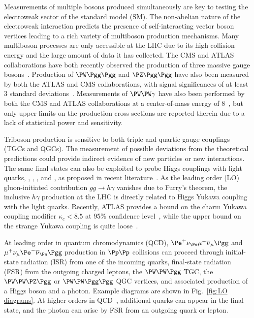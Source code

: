 \maketitle 

Measurements of multiple bosons produced simultaneously are key to testing the electroweak sector of the standard model (SM). The non-abelian nature of the electroweak interaction predicts the presence of self-interacting vector boson vertices leading to a rich variety of multiboson production mechanisms. Many multiboson processes are only accessible at the LHC due to its high collision energy and the large amount of data it has collected. The CMS and ATLAS collaborations have both recently observed the production of three massive gauge bosons~\cite{CMS:2020hjs,ATLAS:2021atz}.  Production of $\PW\Pgg\Pgg$ and $\PZ\Pgg\Pgg$ have also been measured by both the ATLAS and CMS collaborations, with signal significances of at least 3 standard deviations~\cite{ATLAS:2015ify,ATLAS:2016qjc,CMS:2017tzy,CMS:2021jji}. Measurements of $\PW\PW\gamma$ have also been performed by both the CMS and ATLAS collaborations at a center-of-mass energy of 8\TeV~\cite{CMS:2014cdf,ATLAS:2017bon}, but only upper limits on the production cross sections are reported therein due to a lack of statistical power and sensitivity.

Triboson production is sensitive to both triple and quartic gauge couplings (TGCs and QGCs). The measurement of possible deviations from the theoretical predictions could provide indirect evidence of new particles or new interactions. The same final states can also be exploited to probe Higgs couplings with light quarks, \PQc, \PQs, \PQu, and \PQd, as proposed in recent literature~\cite{Khanpour:2017inb,Aguilar-Saavedra:2020rgo,Falkowski:2020znk}. As the leading order (LO) gluon-initiated contribution $gg\rightarrow h\gamma$ vanishes due to Furry’s theorem, the inclusive $h\gamma$ production at the LHC is directly related to Higgs Yukawa coupling with the light quarks. Recently, ATLAS provides a bound on the charm Yukawa coupling modifier $\kappa_c<8.5$ at 95\% confidence level~\cite{ATLAS:2021zwx}, while the upper bound on the strange Yukawa coupling is quite loose~\cite{Duarte-Campderros:2018ouv,ATLAS:2018xfc}.

At leading order in quantum chromodynamics (QCD), $\Pe^+\nu_{\Pe}\mu^-\overline{\nu}_{\mu}\Pgg$ and $\mu^+\nu_{\mu}\Pe^-\overline{\nu}_{\Pe}\Pgg$ production in $\Pp\Pp$ collisions can proceed through initial-state radiation (ISR) from one of the incoming quarks, final-state radiation (FSR) from the outgoing charged leptons, the $\PW\PW\Pgg$ TGC, the $\PW\PW\PZ\Pgg$ or $\PW\PW\Pgg\Pgg$ QGC vertices, and  associated production of a Higgs boson and a photon. Example diagrams are shown in Fig.~\ref{fig:LO diagrams}. At higher orders in QCD~\cite{Zhu:2020ous}, additional quarks can appear in the final state, and the photon can arise by FSR from an outgoing quark or lepton. 

